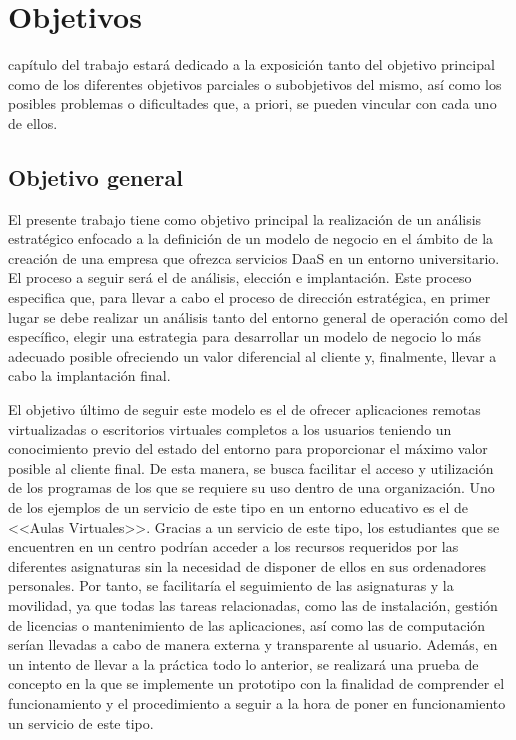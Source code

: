\chapter{Objetivos}
\label{chap:objetivos}

\noindent
{} capítulo del trabajo estará dedicado a la exposición tanto del objetivo principal como de los diferentes objetivos parciales o subobjetivos del mismo, así como los posibles problemas o dificultades que, a priori, se pueden vincular con cada uno de ellos.

\section{Objetivo general}
El presente trabajo tiene como objetivo principal la realización de un análisis estratégico enfocado a la definición de un modelo de negocio en el ámbito de la creación de una empresa que ofrezca servicios \acs{DaaS} en un entorno universitario. El proceso a seguir será el de análisis, elección e implantación. Este proceso especifica que, para llevar a cabo el proceso de dirección estratégica, en primer lugar se debe realizar un análisis tanto del entorno general de operación como del específico, elegir una estrategia para desarrollar un modelo de negocio lo más adecuado posible ofreciendo un valor diferencial al cliente y, finalmente, llevar a cabo la implantación final.

El objetivo último de seguir este modelo es el de ofrecer aplicaciones remotas virtualizadas o escritorios virtuales completos a los usuarios teniendo un conocimiento previo del estado del entorno para proporcionar el máximo valor posible al cliente final. De esta manera, se busca facilitar el acceso y utilización de los programas de los que se requiere su uso dentro de una organización. Uno de los ejemplos de un servicio de este tipo en un entorno educativo es el de <<Aulas Virtuales>>. Gracias a un servicio de este tipo, los estudiantes que se encuentren en un centro podrían acceder a los recursos requeridos por las diferentes asignaturas sin la necesidad de disponer de ellos en sus ordenadores personales. Por tanto, se facilitaría el seguimiento de las asignaturas y la movilidad, ya que todas las tareas relacionadas, como las de instalación, gestión de licencias o mantenimiento de las aplicaciones, así como las de computación serían llevadas a cabo de manera externa y transparente al usuario. Además, en un intento de llevar a la práctica todo lo anterior, se realizará una prueba de concepto en la que se implemente un prototipo con la finalidad de comprender el funcionamiento y el procedimiento a seguir a la hora de poner en funcionamiento un servicio de este tipo.


